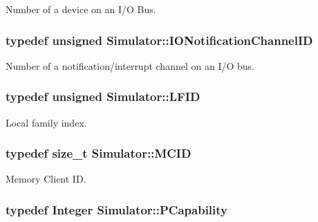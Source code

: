 Number of a device on an I/\+O Bus. 

\hypertarget{namespace_simulator_a951e1bf3ee91c11c980382a7bcbba287}{
\subsubsection[{I\+O\+Notification\+Channel\+I\+D}]{\setlength{\rightskip}{0pt plus 5cm}typedef unsigned {\bf Simulator\+::\+I\+O\+Notification\+Channel\+I\+D}}}\label{namespace_simulator_a951e1bf3ee91c11c980382a7bcbba287}


Number of a notification/interrupt channel on an I/\+O bus. 

\hypertarget{namespace_simulator_aaccbc706b2d6c99085f52f6dfc2333e4}{
\subsubsection[{L\+F\+I\+D}]{\setlength{\rightskip}{0pt plus 5cm}typedef unsigned {\bf Simulator\+::\+L\+F\+I\+D}}}\label{namespace_simulator_aaccbc706b2d6c99085f52f6dfc2333e4}


Local family index. 

\hypertarget{namespace_simulator_a4b5747ff30c62c6373badf3b53b9abf7}{
\subsubsection[{M\+C\+I\+D}]{\setlength{\rightskip}{0pt plus 5cm}typedef size\+\_\+t {\bf Simulator\+::\+M\+C\+I\+D}}}\label{namespace_simulator_a4b5747ff30c62c6373badf3b53b9abf7}


Memory Client I\+D. 

\hypertarget{namespace_simulator_a6b57ad19b5768f31acd2aaf9fe53bcd9}{
\subsubsection[{P\+Capability}]{\setlength{\rightskip}{0pt plus 5cm}typedef Integer {\bf Simulator\+::\+P\+Capability}}}\label{namespace_simulator_a6b57ad19b5768f31acd2aaf9fe53bcd9}


